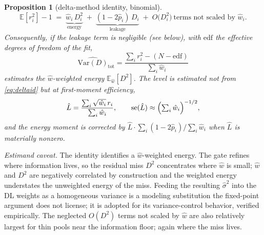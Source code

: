 \documentclass[11pt]{article}
\newtheorem{proposition}{Proposition}[section]
\newcommand{\E}{\mathbb{E}}
\newcommand{\Var}{\mathrm{Var}}
\begin{document}
\begin{proposition}[delta-method identity, binomial]\label{prop:total}
\begin{equation}\label{eq:deltaid}
\E[r_i^2]-1
\;=\;
\underbrace{\hat w_i\,D_i^2}_{\text{energy}}
\;+\;
\underbrace{(1-2\hat p_i)\,D_i}_{\text{leakage}}
\;+\;O\!\bigl(D_i^2\bigr)\ \text{terms not scaled by }\hat w_i .
\end{equation}
Consequently, if the leakage term is negligible (see below), with $\mathrm{edf}$ the
effective degrees of freedom of the fit,
\begin{equation}\label{eq:totalmoment}
\widehat{\Var(D)}_{\mathrm{tot}}
=\frac{\sum_i r_i^2-(N-\mathrm{edf})}{\sum_i \hat w_i}
\end{equation}
estimates the $\hat w$-weighted energy $\E_{\hat w}[D^2]$. The level is estimated
not from \eqref{eq:deltaid} but at first-moment efficiency,
\begin{equation}\label{eq:level}
\hat L=\frac{\sum_i\sqrt{\hat w_i}\,r_i}{\sum_i\hat w_i},
\qquad \mathrm{se}(\hat L)\approx\Bigl(\textstyle\sum_i\hat w_i\Bigr)^{-1/2},
\end{equation}
and the energy moment is corrected by
$\hat L\cdot\sum_i(1-2\hat p_i)/\sum_i\hat w_i$ when $\hat L$ is materially nonzero.
\end{proposition}

\emph{Estimand caveat.} The identity identifies a $\hat w$-weighted energy.
The gate refines where information lives, so the residual miss $D^2$
concentrates where $\hat w$ is small; $\hat w$ and $D^2$ are negatively
correlated by construction and the weighted energy understates the unweighted
energy of the miss. Feeding the resulting $\hat\sigma^2$ into the DL weights
as a homogeneous variance is a modeling substitution the fixed-point argument
does not license; it is adopted for its variance-control behavior, verified
empirically. The neglected $O(D^2)$ terms not scaled by $\hat w$ are also
relatively largest for thin pools near the information floor; again where
the miss lives.
\end{document}
